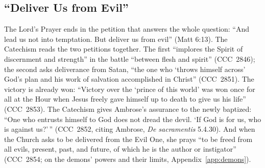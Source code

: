 \sectionguard
\subsection{``Deliver Us from Evil''}

The Lord's Prayer ends in the petition that answers the whole question:
``And lead us not into temptation. But deliver us from evil'' (Matt 6:13).
The Catechism reads the two petitions together. The first ``implores the
Spirit of discernment and strength'' in the battle ``between flesh and
spirit'' (CCC~2846); the second asks deliverance from Satan, ``the one who
`throws himself across' God's plan and his work of salvation accomplished
in Christ'' (CCC~2851). The victory is already won: ``Victory over the
`prince of this world' was won once for all at the Hour when Jesus freely
gave himself up to death to give us his life'' (CCC~2853). The Catechism
gives Ambrose's assurance to the newly baptized: ``One who entrusts himself
to God does not dread the devil. `If God is for us, who is against
us?'\,'' (CCC~2852, citing Ambrose, \emph{De sacramentis} 5.4.30). And when
the Church asks to be delivered from the Evil One, she prays ``to be freed
from all evils, present, past, and future, of which he is the author or
instigator'' (CCC~2854; on the demons' powers and their limits,
Appendix~\ref{app:demons}).
